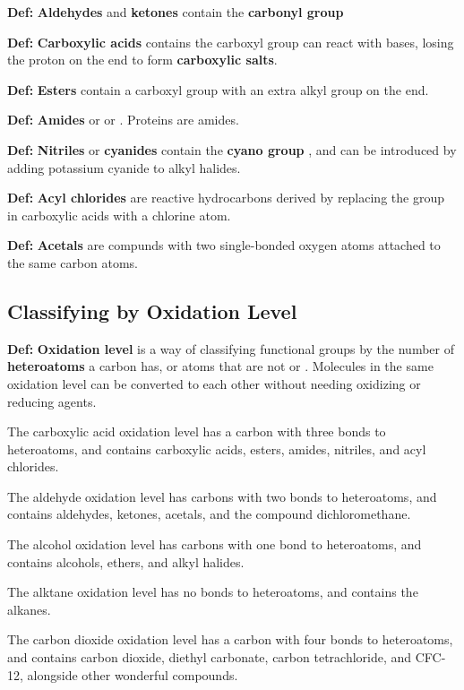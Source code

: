 \documentclass{article}
\begin{document}
\textbf{Def:} \textbf{Aldehydes}  and \textbf{ketones}  contain the \textbf{carbonyl group} 

\textbf{Def:} \textbf{Carboxylic acids}  contains the carboxyl group  can react with bases, losing the proton on the end to form \textbf{carboxylic salts}. 

\textbf{Def:} \textbf{Esters}  contain a carboxyl group with an extra alkyl group on the end. 

\textbf{Def:} \textbf{Amides}  or  or . Proteins are amides.

\textbf{Def:} \textbf{Nitriles} or \textbf{cyanides} contain the \textbf{cyano group} , and can be introduced by adding potassium cyanide to alkyl halides. 

\textbf{Def:} \textbf{Acyl chlorides}  are reactive hydrocarbons derived by replacing the  group in carboxylic acids with a chlorine atom.

\textbf{Def:} \textbf{Acetals} are compunds with two single-bonded oxygen atoms attached to the same carbon atoms. 

\subsection{Classifying by Oxidation Level}

\textbf{Def:} \textbf{Oxidation level} is a way of classifying functional groups by the number of \textbf{heteroatoms} a carbon has, or atoms that are not  or . Molecules in the same oxidation level can be converted to each other without needing oxidizing or reducing agents.

The carboxylic acid oxidation level has a carbon with three bonds to heteroatoms, and contains carboxylic acids, esters, amides, nitriles, and acyl chlorides.

The aldehyde oxidation level has carbons with two bonds to heteroatoms, and contains aldehydes, ketones, acetals, and the compound dichloromethane.

The alcohol oxidation level has carbons with one bond to heteroatoms, and contains alcohols, ethers, and alkyl halides.

The alktane oxidation level has no bonds to heteroatoms, and contains the alkanes.

The carbon dioxide oxidation level has a carbon with four bonds to heteroatoms, and contains carbon dioxide, diethyl carbonate, carbon tetrachloride, and CFC-12, alongside other wonderful compounds. 
\end{document}
